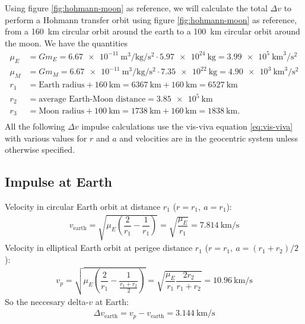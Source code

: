 Using figure \ref{fig:hohmann-moon} as reference, we will calculate the total $\Delta v$ to perform a Hohmann transfer orbit using figure \ref{fig:hohmann-moon} as reference, from a \SI{160}{\km} circular orbit around the earth to a \SI{100}{\km} circular orbit around the moon. We have the quantities \cite{ma}
\begin{align}
\mu_E &= G m_E = \SI[per-mode=fraction]{6.67e-11}{\m\cubed\per\kg\per\s\squared} \cdot \SI{5.97e24}{\kg} = \SI{3.99e5}{\km\cubed\per\s\squared} \\[0.2cm]
\mu_M &= G m_M = \SI[per-mode=fraction]{6.67e-11}{\m\cubed\per\kg\per\s\squared} \cdot \SI{7.35e22}{\kg} = \SI{4.90e3}{\km\cubed\per\s\squared} \\[0.2cm]
r_1 &= \text{Earth radius} + \SI{160}{\km} = \SI{6367}{\km}+ \SI{160}{\km} = \SI{6527}{\km} \\[0.2cm]
r_2 &= \text{average Earth-Moon distance} = \SI{3.85e5}{\km} \\[0.2cm]
r_3 &= \text{Moon radius} + \SI{100}{\km} = \SI{1738}{\km}+ \SI{160}{\km} = \SI{1838}{\km}.\\
\end{align}
All the following $\Delta v$ impulse calculations use the vis-viva equation \eqref{eq:vis-viva} with various values for $r$ and $a$ and velocities are in the geocentric system unless otherwise specified.

\subsection{Impulse at Earth}
Velocity in circular Earth orbit at distance $r_1$ ($r = r_1,\ a = r_1$):
\begin{align}
v_{\text{earth}} = \sqrt{\mu_E\left(\dfrac{2}{r_1} - \dfrac{1}{r_1}\right)} = \sqrt{\dfrac{\mu_E}{r_1}} = \SI{7.814}{\km\per\s} \label{eq:v-earth}
\end{align}
Velocity in elliptical Earth orbit at perigee distance $r_1$ ($r = r_1,\ a = (r_1+r_2)/2$):
\begin{align}
v_p = \sqrt{\mu_E\left(\dfrac{2}{r_1} - \dfrac{1}{\frac{r_1+r_2}{2}}\right)} = \sqrt{\dfrac{\mu_E}{r_1} \dfrac{2 r_2}{r_1+r_2}} = \SI{10.96}{\km\per\s} \label{eq:vp}
\end{align}
So the neccesary delta-$v$ at Earth:
\begin{align}
\Delta v_{\text{earth}} = v_p - v_{\text{earth}} = \SI{3.144}{\km\per\s} \label{eq:deltav-earth}
\end{align}
